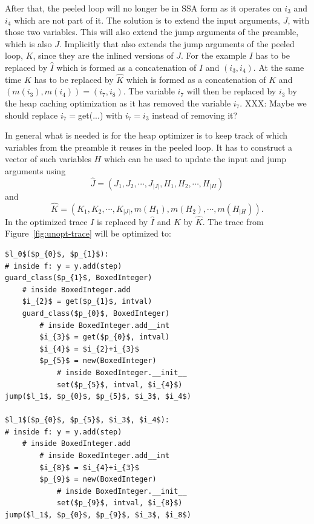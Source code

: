 \documentclass[preprint]{sigplanconf}
\begin{document}
After that, the peeled loop
will no longer be in SSA form as it operates on $i_3$ and $i_4$
which are not part of it. The solution is to extend the input
arguments, $J$, with those two variables. This will also extend the
jump arguments of the preamble, which is also $J$. 
Implicitly that also extends the jump arguments of the peeled loop, $K$,
since they are the inlined versions of $J$. For the example $I$ has to
be replaced by $\hat I$ which is formed as a concatenation of $I$ and
$\left(i_3, i_4\right)$. At the same time $K$ has to be replaced by
$\hat K$ which is formed as a concatenation of $K$ and 
$\left(m\left(i_3\right), m\left(i_4\right)\right) = \left(i_7, i_8\right)$. 
The variable $i_7$ will then be replaced by $i_3$ by the heap caching
optimization as it has removed the variable $i_7$. XXX: Maybe we should
replace $i_7=$get(...) with $i_7=i_3$ instead of removing it?

In general what is needed is for the heap optimizer is to keep track of
which variables from the preamble it reuses in the peeled loop.
It has to construct a vector of such variables $H$ which
can be used to update the input and jump arguments using
\begin{equation}
  \hat J = \left(J_1, J_2, \cdots, J_{|J|}, H_1, H_2, \cdots, H_{|H}\right)
  \label{eq:heap-inputargs}
\end{equation}
and
\begin{equation}
  \hat K = \left(K_1, K_2, \cdots, K_{|J|}, m(H_1), m(H_2), \cdots, m(H_{|H})\right)
  .
  \label{eq:heap-jumpargs}
\end{equation}
In the optimized trace $I$ is replaced by $\hat I$ and $K$ by $\hat
K$. The trace from Figure~\ref{fig:unopt-trace} will be optimized to:

\begin{lstlisting}[mathescape,numbers = right,basicstyle=\setstretch{1.05}\ttfamily\scriptsize]
$l_0$($p_{0}$, $p_{1}$):
# inside f: y = y.add(step)
guard_class($p_{1}$, BoxedInteger)
    # inside BoxedInteger.add
    $i_{2}$ = get($p_{1}$, intval)
    guard_class($p_{0}$, BoxedInteger)
        # inside BoxedInteger.add__int
        $i_{3}$ = get($p_{0}$, intval)
        $i_{4}$ = $i_{2}+i_{3}$
        $p_{5}$ = new(BoxedInteger)
            # inside BoxedInteger.__init__
            set($p_{5}$, intval, $i_{4}$)
jump($l_1$, $p_{0}$, $p_{5}$, $i_3$, $i_4$)

$l_1$($p_{0}$, $p_{5}$, $i_3$, $i_4$):
# inside f: y = y.add(step)
    # inside BoxedInteger.add
        # inside BoxedInteger.add__int
        $i_{8}$ = $i_{4}+i_{3}$
        $p_{9}$ = new(BoxedInteger)
            # inside BoxedInteger.__init__
            set($p_{9}$, intval, $i_{8}$)
jump($l_1$, $p_{0}$, $p_{9}$, $i_3$, $i_8$)
\end{lstlisting}
\end{document}
